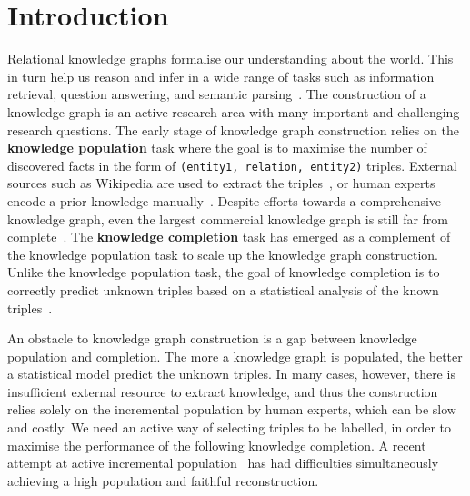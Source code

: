 
\section{Introduction}
\label{sec:intro}

Relational knowledge graphs formalise our understanding about the world. 
This in turn help us reason and infer in a wide range of tasks such as information retrieval, question answering, and semantic parsing~\cite{Dong2015,jiang2015improving,kim2013context}.
The construction of a knowledge graph is an active research area with many important and challenging research questions.
The early stage of knowledge graph construction relies on the {\bf knowledge population} task
where the goal is to maximise the number of discovered facts in the form of \texttt{(entity1, relation, entity2)} triples.
External sources such as Wikipedia are used to extract the triples~\cite{hoffart2013yago2},
or human experts encode a prior knowledge manually~\cite{bollacker2008freebase}.
Despite efforts towards a comprehensive knowledge graph,
even the largest commercial knowledge graph is still far from complete~\cite{dong2014knowledge}.
The {\bf knowledge completion} task has emerged as a complement of the knowledge population task
to scale up the knowledge graph construction.
Unlike the knowledge population task, the goal of knowledge completion is to correctly predict unknown triples based on a statistical analysis of the known triples~\cite{Lao2010,nickel2011three}.

An obstacle to knowledge graph construction is a gap between knowledge
population and completion. The more a knowledge graph is populated, the better a statistical model predict the unknown triples. In many cases, however, there is insufficient external resource to extract knowledge, and thus the construction relies solely on the incremental population by human experts, which can be slow and costly.
We need an active way of selecting triples to be labelled, in order to maximise the performance of the following knowledge completion.
A recent attempt at active incremental population~\cite{kajino2015active}
has had difficulties simultaneously achieving a high population and faithful reconstruction.

